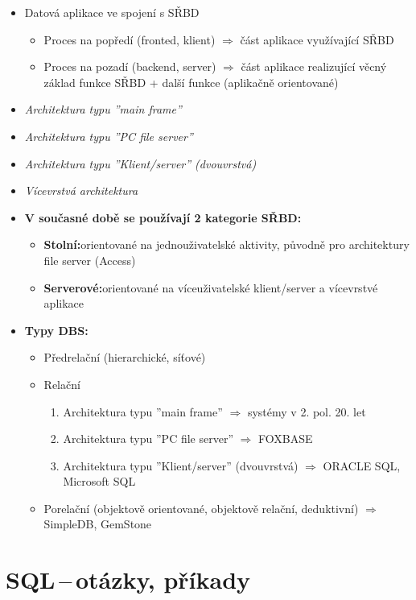 \documentclass[a4paper,10pt]{article}
\newcommand{\pojem}[2]{\item \textbf{#1:}\quad #2}
\newcommand{\tedy}{$\Rightarrow$ }
\begin{document}
				\begin{itemize}
					\item Datová aplikace ve spojení s SŘBD
					\begin{itemize}
						\item Proces na popředí (fronted, klient) \tedy část aplikace využívající SŘBD
						\item Proces na pozadí (backend, server) \tedy část aplikace realizující věcný základ funkce SŘBD + další funkce (aplikačně orientované)
					\end{itemize}

					\item \emph{Architektura typu ''main frame''}
					\item \emph{Architektura typu ''PC file server''}
					\item \emph{Architektura typu ''Klient/server'' (dvouvrstvá)}
					\item \emph{Vícevrstvá architektura}

					\pojem{V současné době se používají 2 kategorie SŘBD}
					\begin{itemize}
						\pojem{Stolní}{orientované na jednouživatelské aktivity, původně pro architektury file server (Access)}
						\pojem{Serverové}{orientované na víceuživatelské klient/server a vícevrstvé aplikace}
					\end{itemize}

					\pojem{Typy DBS}
					\begin{itemize}
						\item Předrelační (hierarchické, síťové)
						\item Relační
						\begin{enumerate}
							\item Architektura typu ''main frame'' \tedy systémy v 2. pol. 20. let
							\item Architektura typu ''PC file server'' \tedy FOXBASE
							\item Architektura typu ''Klient/server'' (dvouvrstvá) \tedy ORACLE SQL, Microsoft SQL
						\end{enumerate}
						\item Porelační (objektově orientované, objektově relační, deduktivní) \tedy SimpleDB, GemStone
					\end{itemize}
				\end{itemize}

	\section{SQL\,--\,otázky, příkady}
\end{document}
